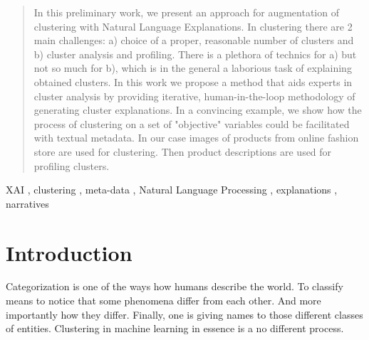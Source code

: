 \documentclass[
 twocolumn,
]{ceurart}
\begin{document}
\begin{abstract}
  In this preliminary work, we present an approach for augmentation of clustering  with Natural Language Explanations.
  In clustering there are 2 main challenges: a) choice of a proper, reasonable number of clusters and b) cluster analysis and profiling.
  There is a plethora of technics for a) but not so much for b), which is in the general a laborious task of explaining obtained clusters.
  In this work we propose a method that aids experts in cluster analysis by providing iterative, human-in-the-loop methodology of generating cluster explanations.
  In a convincing example, we show how the process of clustering on a set of "objective" variables could be facilitated with textual metadata.
  In our case images of products from online fashion store are used for clustering.
  Then product descriptions are used for profiling clusters.
\end{abstract}

\begin{keywords}
  XAI \sep
  clustering \sep
  meta-data \sep
  Natural Language Processing \sep
  explanations \sep
  narratives
\end{keywords}

\maketitle

\section{Introduction}
Categorization is one of the ways how humans describe the world.
To classify means to notice that some phenomena differ from each other.
And more importantly how they differ.
Finally, one is giving names to those different classes of entities.
Clustering in machine learning in essence is a no different process.
\end{document}
